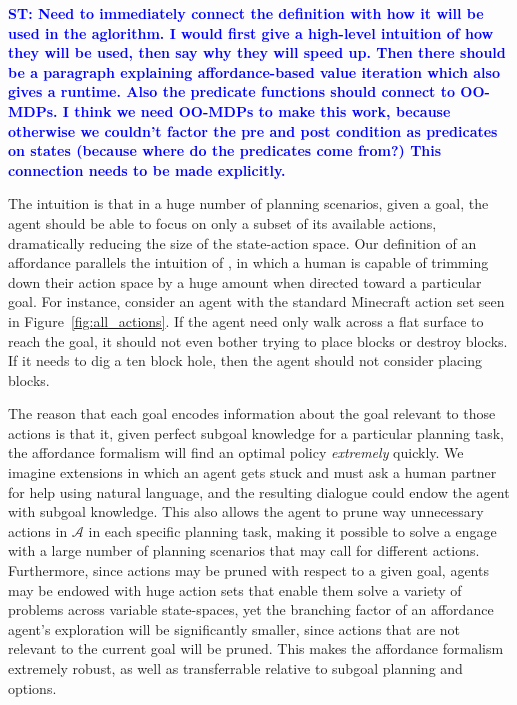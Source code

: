 \documentclass[]{article}
\newcommand{\stnote}[1]{\textcolor{Blue}{\textbf{ST: #1}}}
\begin{document}
\stnote{Need to immediately connect the definition with how it will be
  used in the aglorithm.  I would first give a high-level intuition of
  how they will be used, then say why they will speed up.  Then there
  should be a paragraph explaining affordance-based value iteration
  which also gives a runtime.  Also the predicate functions should
  connect to OO-MDPs.  I think we need OO-MDPs to make this work,
  because otherwise we couldn't factor the pre and post condition as
  predicates on states (because where do the predicates come from?)
  This connection needs to be made explicitly.}

The intuition is that in a huge number of planning scenarios, given a
goal, the agent should be able to focus on only a subset of its
available actions, dramatically reducing the size of the state-action
space. Our definition of an affordance parallels the intuition of
\citet{gibson77}, in which a human is capable of trimming down their
action space by a huge amount when directed toward a particular
goal. For instance, consider an agent with the standard Minecraft
action set seen in Figure~\ref{fig:all_actions}.  If the agent need
only walk across a flat surface to reach the goal, it should not even
bother trying to place blocks or destroy blocks. If it needs to dig a
ten block hole, then the agent should not consider placing blocks.

The reason that each goal encodes information about the goal relevant
to those actions is that it, given perfect subgoal knowledge for a
particular planning task, the affordance formalism will find an
optimal policy {\it extremely} quickly. We imagine extensions in which
an agent gets stuck and must ask a human partner for help using
natural language, and the resulting dialogue could endow the agent
with subgoal knowledge. This also allows the agent to prune way
unnecessary actions in $\mathcal{A}$ in each specific planning task,
making it possible to solve a engage with a large number of planning
scenarios that may call for different actions. Furthermore, since
actions may be pruned with respect to a given goal, agents may be
endowed with huge action sets that enable them solve a variety of
problems across variable state-spaces, yet the branching factor of an
affordance agent's exploration will be significantly smaller, since
actions that are not relevant to the current goal will be pruned. This
makes the affordance formalism extremely robust, as well as
transferrable relative to subgoal planning and options.
\end{document}
